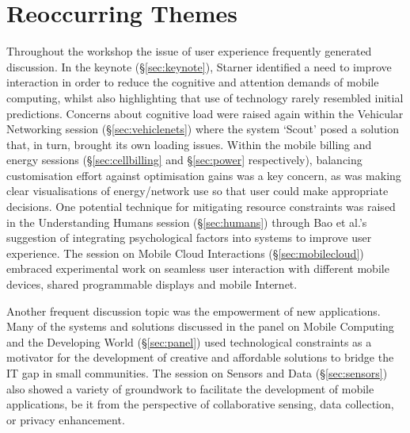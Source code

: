 \section{Reoccurring Themes}
\label{sec:keythemes}

Throughout the workshop the issue of user experience frequently generated 
discussion. In the keynote (\S\ref{sec:keynote}), Starner identified a need 
to improve interaction in order to reduce the cognitive and attention demands of 
mobile computing, whilst also highlighting that use of technology 
rarely resembled initial 
predictions. Concerns about cognitive load were raised again within the Vehicular 
Networking session (\S\ref{sec:vehiclenets}) where the system `Scout' posed 
a solution that, in turn, brought its own loading issues. Within the mobile 
billing and energy sessions (\S\ref{sec:cellbilling} and \S\ref{sec:power} 
respectively), balancing customisation effort against optimisation gains was a 
key concern, as was making clear visualisations of energy\slash network
use so that user could make appropriate decisions. One potential technique for 
mitigating resource constraints was raised in the Understanding Humans session 
(\S\ref{sec:humans}) through Bao et al.'s suggestion of integrating
psychological factors into systems to improve user experience. The
session on Mobile Cloud Interactions (\S\ref{sec:mobilecloud}) embraced
experimental work on seamless user interaction with different mobile
devices, shared programmable displays and mobile Internet.

Another frequent discussion topic was the empowerment of new
applications. Many of the systems and solutions discussed in 
the panel on Mobile Computing and the Developing
World (\S\ref{sec:panel}) used
technological constraints as a motivator for the development of creative and
affordable solutions to bridge the IT gap in small communities. The
session on Sensors and Data (\S\ref{sec:sensors}) also showed a variety
of groundwork to facilitate the development of mobile applications,
be it from the perspective of collaborative sensing, data collection,
or privacy enhancement.


